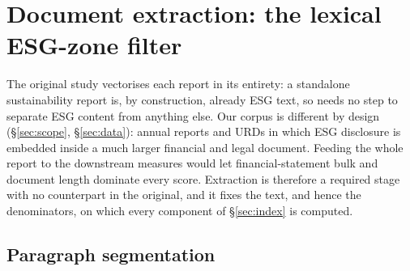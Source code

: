 \section{Document extraction: the lexical ESG-zone filter}
\label{sec:extraction}

The original study vectorises each report in its entirety: a standalone
sustainability report is, by construction, already ESG text, so
\citet{lagasio2024} needs no step to separate ESG content from anything else.
Our corpus is different by design (\S\ref{sec:scope}, \S\ref{sec:data}): annual
reports and URDs in which ESG disclosure is embedded inside a much larger
financial and legal document. Feeding the whole report to the downstream
measures would let financial-statement bulk and document length dominate
every score. Extraction is therefore a required stage with no counterpart in
the original, and it fixes the text, and hence the denominators, on which every
component of \S\ref{sec:index} is computed.

\subsection{Paragraph segmentation}

